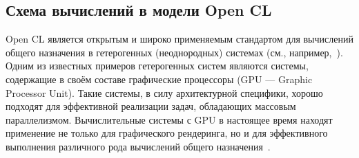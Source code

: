 

\subsection*{Схема вычислений в модели Open CL}
\label{sec:OCLprog}




Open CL является открытым и широко применяемым стандартом для вычислений
общего назначения в 
гетерогенных (неоднородных) системах
(см., например,~\cite{paper_heterog_NIISI, paper_OCL_Komdiv, paper_Deg_Bogd}). 
Одним из известных примеров гетерогенных систем являются системы,
содержащие в своём составе графические процессоры (GPU --- Graphic Processor Unit).
Такие системы, в силу архитектурной специфики,   
хорошо подходят для эффективной реализации задач,
обладающих массовым параллелизмом.
Вычислительные системы с GPU в настоящее время находят применение не только для
графического рендеринга, но и для %
эффективного выполнения различного рода
вычислений общего назначения~\cite{paper_gpgpu_review, paper_OCL_Komdiv}. 



